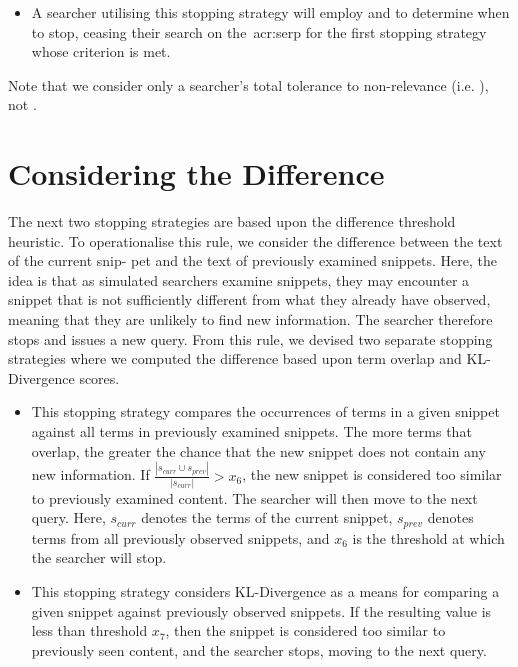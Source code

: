 \begin{itemize}
    \item[\blueboxbold{SS5}] A searcher utilising this stopping strategy will employ  and  to determine when to stop, ceasing their search on the~\gls{acr:serp} for the first stopping strategy whose criterion is met.
\end{itemize}

Note that we consider only a searcher's total tolerance to non-relevance (i.e. ), not .


\section{Considering the Difference}
The next two stopping strategies are based upon the difference threshold heuristic. To operationalise this rule, we consider the difference between the text of the current snip- pet and the text of previously examined snippets. Here, the idea is that as simulated searchers examine snippets, they may encounter a snippet that is not sufficiently different from what they already have observed, meaning that they are unlikely to find new information. The searcher therefore stops and issues a new query. From this rule, we devised two separate stopping strategies where we computed the difference based upon term overlap and KL-Divergence scores.

\begin{itemize}
    \item[\blueboxbold{SS6}] This stopping strategy compares the occurrences of terms in a given snippet against all terms in previously examined snippets. The more terms that overlap, the greater the chance that the new snippet does not contain any new information. If $\frac{|s_{curr} \cup s_{prev}|}{|s_{curr}|} > x_6$, the new snippet is considered too similar to previously examined content. The searcher will then move to the next query. Here, $s_{curr}$ denotes the terms of the current snippet, $s_{prev}$ denotes terms from all previously observed snippets, and $x_6$ is the threshold at which the searcher will stop.
\end{itemize}

\begin{itemize}
    \item[\blueboxbold{SS7}] This stopping strategy considers KL-Divergence as a means for comparing a given snippet against previously observed snippets. If the resulting value is less than threshold $x_7$, then the snippet is considered too similar to previously seen content, and the searcher stops, moving to the next query.
\end{itemize}

